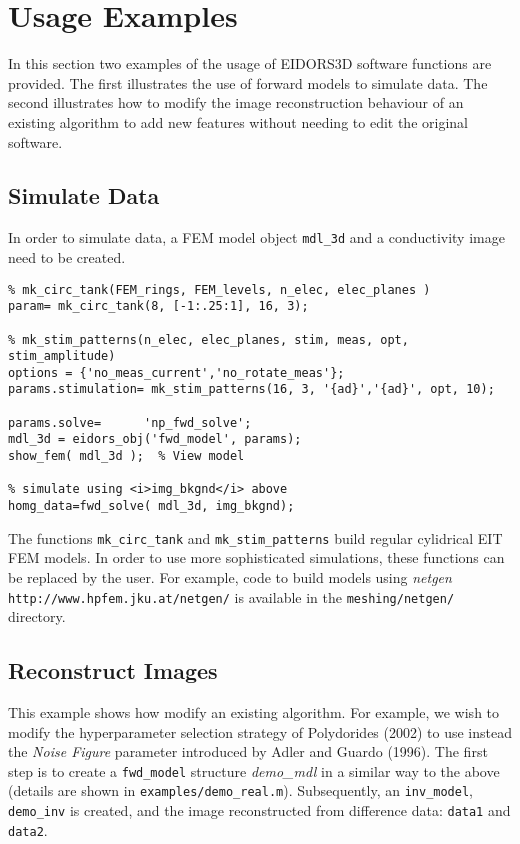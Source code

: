 \documentclass[12pt]{iopart}
\begin{document}
\section{ Usage Examples}

In this section two examples of the usage of EIDORS3D
software functions are provided. The first illustrates
the use of forward models to simulate data. The second
illustrates how to modify the image reconstruction
behaviour of an existing algorithm to
add new features without needing to edit the original
software.

\subsection{ Simulate Data }
In order to simulate data, a FEM model object {\tt mdl\_3d}
and a conductivity image need to be created.
\begin{verbatim}
% mk_circ_tank(FEM_rings, FEM_levels, n_elec, elec_planes )
param= mk_circ_tank(8, [-1:.25:1], 16, 3);

% mk_stim_patterns(n_elec, elec_planes, stim, meas, opt, stim_amplitude)
options = {'no_meas_current','no_rotate_meas'};
params.stimulation= mk_stim_patterns(16, 3, '{ad}','{ad}', opt, 10);

params.solve=      'np_fwd_solve';
mdl_3d = eidors_obj('fwd_model', params);
show_fem( mdl_3d );  % View model

% simulate using <i>img_bkgnd</i> above
homg_data=fwd_solve( mdl_3d, img_bkgnd);
\end{verbatim}

The functions {\tt mk\_circ\_tank} and {\tt mk\_stim\_patterns}
build regular cylidrical EIT FEM models. In order to use more
sophisticated simulations, these functions can be replaced
by the user. For example, code to build models using {\em netgen}
{\tt http://www.hpfem.jku.at/netgen/} is available in the
{\tt meshing/netgen/} directory.

\subsection{  Reconstruct Images }

This example shows how modify an existing algorithm.
For example, we wish to modify the
hyperparameter selection strategy of Polydorides (2002) to use
instead the {\em Noise Figure} parameter introduced by
Adler and Guardo (1996). The first step is to create a
{\tt fwd\_model} structure {\em demo\_mdl} in a similar
way to the above (details are shown in {\tt examples/demo\_real.m}).
Subsequently, an {\tt inv\_model}, {\tt demo\_inv} is created,
and the image reconstructed from difference data: 
{\tt data1} and {\tt data2}.
\end{document}

